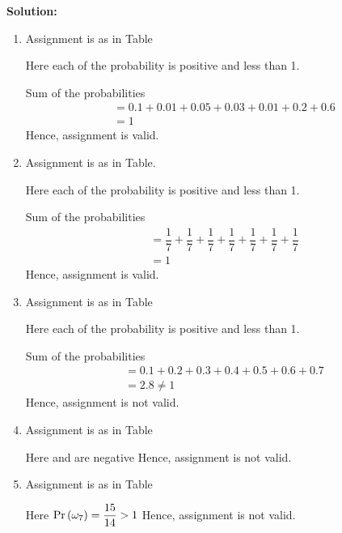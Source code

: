 \documentclass[journal,12pt,twocolumn]{IEEEtran}
\begin{document}
\textbf{Solution:}
\begin{enumerate}[label=(\alph*)]

\item Assignment  is as in Table 

Here each of the probability is positive and less than 1.

Sum of the probabilities 
\begin{align}
    &= 0.1 + 0.01 + 0.05 + 0.03 + 0.01 + 0.2 + 0.6\\
    &= 1
\end{align}
Hence, assignment  is valid.

\item Assignment  is as in Table.


Here each of the probability is positive and less than 1.

Sum of the probabilities 
\begin{align}
    &= \dfrac{1}{7} + \dfrac{1}{7} + \dfrac{1}{7} + \dfrac{1}{7} + \dfrac{1}{7} + \dfrac{1}{7} + \dfrac{1}{7} \\
    &= 1
\end{align}
Hence, assignment  is valid.

\item Assignment  is as in Table 



Here each of the probability is positive and less than 1.

Sum of the probabilities 
\begin{align}
    &= 0.1 + 0.2 + 0.3 + 0.4 + 0.5 + 0.6 + 0.7\\
    &= 2.8 \neq 1
\end{align}
Hence, assignment  is not valid.

\item Assignment  is as in Table 
 

Here  and  are negative
Hence, assignment  is not valid.

\item Assignment  is as in Table 
 

Here $\Pr\left(\omega_7\right) = \dfrac{15}{14} > 1$
Hence, assignment  is not valid.

\end{enumerate}
\end{document}

